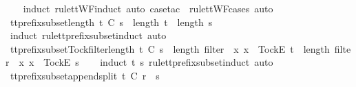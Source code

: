 \begin{isabellebody}
%
\isadelimproof
\ \ %
\endisadelimproof
%
\isatagproof
{}\isamarkupfalse%
\ {\isacharparenleft}induct\ rule{\isacharcolon}ttWF{}{\isachardot}induct{\isacharcomma}\ auto{\isacharcomma}\ {\isacharparenleft}case{\isacharunderscore}tac\ {\isasymrho}\ rule{\isacharcolon}ttWF{\isachardot}cases{\isacharcomma}\ auto{\isacharparenright}{\isacharplus}{\isacharparenright}%
\endisatagproof
{\isafoldproof}%
%
\isadelimproof
\isanewline
%
\endisadelimproof
\isanewline
{}\isamarkupfalse%
\ tt{\isacharunderscore}prefix{\isacharunderscore}subset{\isacharunderscore}length{\isacharcolon}\ {\isachardoublequoteopen}t\ {\isasymlesssim}\isactrlsub C\ s\ {\isasymLongrightarrow}\ length\ t\ {\isasymle}\ length\ s{\isachardoublequoteclose}\isanewline
%
\isadelimproof
\ \ %
\endisadelimproof
%
\isatagproof
{}\isamarkupfalse%
\ {\isacharparenleft}induct\ rule{\isacharcolon}tt{\isacharunderscore}prefix{\isacharunderscore}subset{\isachardot}induct{\isacharcomma}\ auto{\isacharparenright}%
\endisatagproof
{\isafoldproof}%
%
\isadelimproof
\isanewline
%
\endisadelimproof
\isanewline
{}\isamarkupfalse%
\ tt{\isacharunderscore}prefix{\isacharunderscore}subset{\isacharunderscore}Tock{\isacharunderscore}filter{\isacharunderscore}length{\isacharcolon}\ {\isachardoublequoteopen}t\ {\isasymlesssim}\isactrlsub C\ s\ {\isasymLongrightarrow}\ length\ {\isacharparenleft}filter\ {\isacharparenleft}{\isasymlambda}\ x{\isachardot}\ x\ {\isacharequal}\ {\isacharbrackleft}Tock{\isacharbrackright}\isactrlsub E{\isacharparenright}\ t{\isacharparenright}\ {\isasymle}\ length\ {\isacharparenleft}filter\ {\isacharparenleft}{\isasymlambda}\ x{\isachardot}\ x\ {\isacharequal}\ {\isacharbrackleft}Tock{\isacharbrackright}\isactrlsub E{\isacharparenright}\ s{\isacharparenright}{\isachardoublequoteclose}\isanewline
%
\isadelimproof
\ \ %
\endisadelimproof
%
\isatagproof
{}\isamarkupfalse%
\ {\isacharparenleft}induct\ t\ s\ rule{\isacharcolon}tt{\isacharunderscore}prefix{\isacharunderscore}subset{\isachardot}induct{\isacharcomma}\ auto{\isacharparenright}%
\endisatagproof
{\isafoldproof}%
%
\isadelimproof
\isanewline
%
\endisadelimproof
\isanewline
{}\isamarkupfalse%
\ tt{\isacharunderscore}prefix{\isacharunderscore}subset{\isacharunderscore}append{\isacharunderscore}split{\isacharcolon}\ {\isachardoublequoteopen}t\ {\isasymlesssim}\isactrlsub C\ r\ {\isacharat}\ s\ {\isasymLongrightarrow}\isanewline

\end{isabellebody}
